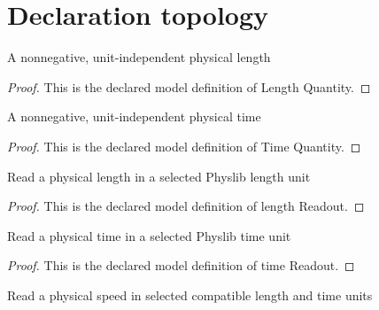 \section{Declaration topology}
\begin{definition}
  \label{def:physics:phyx-mini-0632:phyxminiproblems-problemphyxmini0632-lengthquantity}
  A nonnegative, unit-independent physical length
\end{definition}
\begin{proof}
  This is the declared model definition of Length Quantity.
\end{proof}
\begin{definition}
  \label{def:physics:phyx-mini-0632:phyxminiproblems-problemphyxmini0632-timequantity}
  A nonnegative, unit-independent physical time
\end{definition}
\begin{proof}
  This is the declared model definition of Time Quantity.
\end{proof}
\begin{definition}
  \label{def:physics:phyx-mini-0632:phyxminiproblems-problemphyxmini0632-lengthreadout}
  Read a physical length in a selected Physlib length unit
\end{definition}
\begin{proof}
  This is the declared model definition of length Readout.
\end{proof}
\begin{definition}
  \label{def:physics:phyx-mini-0632:phyxminiproblems-problemphyxmini0632-timereadout}
  Read a physical time in a selected Physlib time unit
\end{definition}
\begin{proof}
  This is the declared model definition of time Readout.
\end{proof}
\begin{definition}
  \label{def:physics:phyx-mini-0632:phyxminiproblems-problemphyxmini0632-speedreadout}
  Read a physical speed in selected compatible length and time units
\end{definition}

